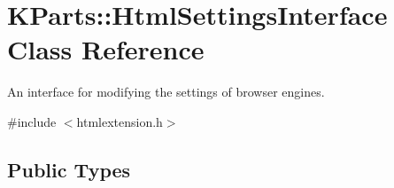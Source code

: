 \hypertarget{classKParts_1_1HtmlSettingsInterface}{\section{K\+Parts\+:\+:Html\+Settings\+Interface Class Reference}
\label{classKParts_1_1HtmlSettingsInterface}
}


An interface for modifying the settings of browser engines.  




{\ttfamily \#include $<$htmlextension.\+h$>$}

\subsection*{Public Types}
